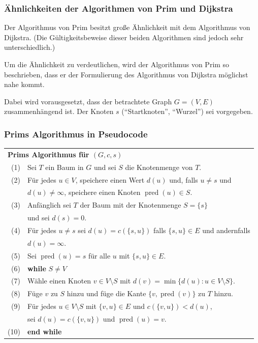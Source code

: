 \documentclass[smaller,xcolor=dvipsnames]{beamer}
\begin{document}
\begin{frame}
\frametitle{Ähnlichkeiten der Algorithmen von Prim und Dijkstra}
Der \alert{Algorithmus von Prim} besitzt große Ähnlichkeit mit dem \alert{Algorithmus von Dijkstra}. (Die Gültigkeitsbeweise dieser beiden Algorithmen sind jedoch sehr unterschiedlich.) \\ \medskip

Um die Ähnlichkeit zu verdeutlichen, wird der Algorithmus von Prim so beschrieben, dass er der Formulierung des Algorithmus von Dijkstra \alert{möglichst nahe kommt}. \\ \medskip

Dabei wird vorausgesetzt, dass der betrachtete Graph $G=(V,E)$ zusammenhängend ist. Der Knoten $s$ (\enquote{Startknoten}, \enquote{Wurzel}) sei vorgegeben.
\end{frame}

\begin{frame}
\frametitle{Prims Algorithmus in Pseudocode}
\begin{center}
	\begin{tabular}{rl}
		\multicolumn{2}{l}{\textbf{Prims Algorithmus für ${(G, c, s)}$}} \\
		(1) & Sei $T$ ein Baum in $G$ und sei $S$ die Knotenmenge von $T$. \\
		(2) & Für jedes $u \in V$, speichere einen Wert $d(u)$ und, falls $u \neq s$ und  \\
		    & \qquad $d(u) \neq \infty$, speichere einen Knoten $\operatorname{pred}(u) \in S$. \\
		(3) & Anfänglich sei $T$ der Baum mit der Knotenmenge $S = \{ s \}$ \\ & \qquad und sei $d(s)=0$. \\
		(4) & Für jedes $u \neq s$ sei $d(u) = c(\{s,u\})$ falls $\{s,u\}\in E$ und andernfalls \\ & \qquad $d(u)=\infty$. \\
		(5) & Sei $\operatorname{pred}(u) = s$ für alle $u$ mit $\{ s,u \} \in E$. \\
		(6) & \textbf{while} $S \neq V$ \\
		(7) & \qquad Wähle einen Knoten $v \in V \setminus S$ mit $d(v) = \min{\bigl\{ d(u) : u \in V \setminus S \bigr\}}$. \\
		(8) & \qquad Füge $v$ zu $S$ hinzu und füge die Kante $\{ v, \operatorname{pred}(v) \}$ zu $T$ hinzu. \\
		(9) & \qquad Für jedes $u \in V \setminus S$ mit $\{v,u\} \in E$ und $c(\{ v,u \}) < d(u)$, \\
		    & \qquad\qquad sei $d(u) = c(\{ v,u \})$ und $\operatorname{pred}(u)=v$. \\
		(10)& \textbf{end while}
	\end{tabular}
\end{center}
\end{frame}
\end{document}
